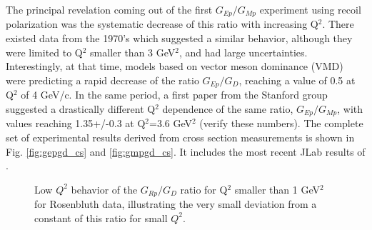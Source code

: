 The principal revelation coming out of the first $G_{Ep}/G_{Mp}$ experiment using recoil polarization was the systematic
decrease of this ratio with increasing Q$^2$. There existed data from the 1970's which suggested a similar behavior, 
although they were limited to Q$^2$ smaller than 3 GeV$^2$, and had large uncertainties. Interestingly, at that time, 
models based on vector meson dominance (VMD) \cite{iachello,hohler,gariA,gariB} were predicting a rapid decrease of the ratio
 $G_{Ep}/G_D$, reaching a value of 0.5 at Q$^2$ of 4 GeV/c. In the same period, a first paper from the Stanford group
\cite{litt} suggested a drastically different Q$^2$ dependence of the same ratio, $G_{Ep}/G_{Mp}$, with values reaching
1.35+/-0.3 at Q$^2$=3.6 GeV$^2$ (verify these numbers). The complete set of experimental results derived from cross 
section measurements is shown in Fig. \ref{fig:gepgd_cs} and \ref{fig:gmpgd_cs}. It includes the most recent JLab results
 of \cite{christy,qattan05}.

\begin{figure}
\begin{center}
\caption{Low $Q^2$ behavior of the $G_{Rp}/G_D$ ratio for Q$^2$ smaller than 1 GeV$^2$ for Rosenbluth data, illustrating the very small deviation from a constant of this ratio for small $Q^2$.}
\label{fig:gepgd}
\end{center}
\end{figure}

